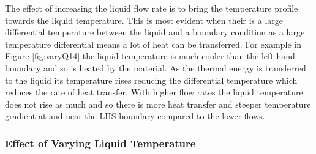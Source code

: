 \documentclass[11pt]{article}
\begin{document}
The effect of increasing the liquid flow rate is to bring the temperature profile towards the liquid temperature. This is most evident when their is a large differential temperature between the liquid and a boundary condition as a large temperature differential means a lot of heat can be transferred. For example in Figure \ref{fig:varyQ14} the liquid temperature is much cooler than the left hand boundary and so is heated by the material. As the thermal energy is transferred to the liquid its temperature rises reducing the differential temperature which reduces the rate of heat transfer. With higher flow rates the liquid temperature does not rise as much and so there is more heat transfer and steeper temperature gradient at and near the LHS boundary compared to the lower flows. 


\clearpage
\subsubsection{Effect of Varying Liquid Temperature}
\end{document}
